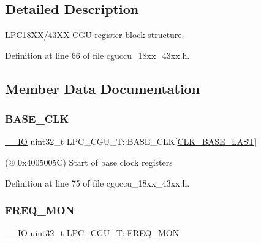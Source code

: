 \subsection{Detailed Description}
L\+P\+C18\+X\+X/43\+XX C\+GU register block structure. 

Definition at line 66 of file cguccu\+\_\+18xx\+\_\+43xx.\+h.



\subsection{Member Data Documentation}
\mbox{\label{struct_l_p_c___c_g_u___t_a33d4c0ad50a5fe9bae6223fd9b49fa5b}} 
\subsubsection{\texorpdfstring{B\+A\+S\+E\+\_\+\+C\+LK}{BASE\_CLK}}
{\footnotesize\ttfamily \hyperlink{core__sc300_8h_aec43007d9998a0a0e01faede4133d6be}{\+\_\+\+\_\+\+IO} uint32\+\_\+t L\+P\+C\+\_\+\+C\+G\+U\+\_\+\+T\+::\+B\+A\+S\+E\+\_\+\+C\+LK\mbox{[}\hyperlink{chip__clocks_8h_a7ffa0364100f6211eb00290d309133d0a4174a4a8b5df9269c2548c2fd1299c2d}{C\+L\+K\+\_\+\+B\+A\+S\+E\+\_\+\+L\+A\+ST}\mbox{]}}

(@ 0x4005005C) Start of base clock registers 

Definition at line 75 of file cguccu\+\_\+18xx\+\_\+43xx.\+h.

\mbox{\label{struct_l_p_c___c_g_u___t_ac8b0e6717ad9d4be4828829ead570832}} 
\subsubsection{\texorpdfstring{F\+R\+E\+Q\+\_\+\+M\+ON}{FREQ\_MON}}
{\footnotesize\ttfamily \hyperlink{core__sc300_8h_aec43007d9998a0a0e01faede4133d6be}{\+\_\+\+\_\+\+IO} uint32\+\_\+t L\+P\+C\+\_\+\+C\+G\+U\+\_\+\+T\+::\+F\+R\+E\+Q\+\_\+\+M\+ON}

